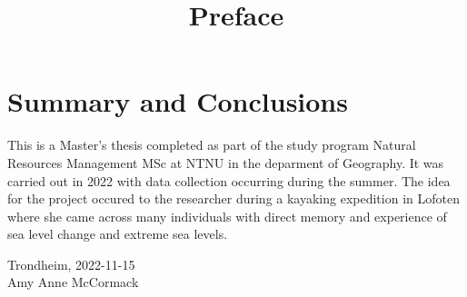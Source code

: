 \section*{Summary and Conclusions}

\title{Preface}
This is a Master's thesis completed as part of the study program Natural Resources Management MSc at NTNU in the deparment of Geography. It was carried out in 2022 with data collection occurring during the summer. The idea for the project occured to the researcher during a kayaking expedition in Lofoten where she came across many individuals with direct memory and experience of sea level change and extreme sea levels. \\[2cm]

\begin{center}
Trondheim, 2022-11-15\\[1pc]


Amy Anne McCormack 
\end{center}

\documentclass{article}
\usepackage{graphicx}
\graphicspath{ {./images/} }
\texttt{[image: fig/to use signature png]}

